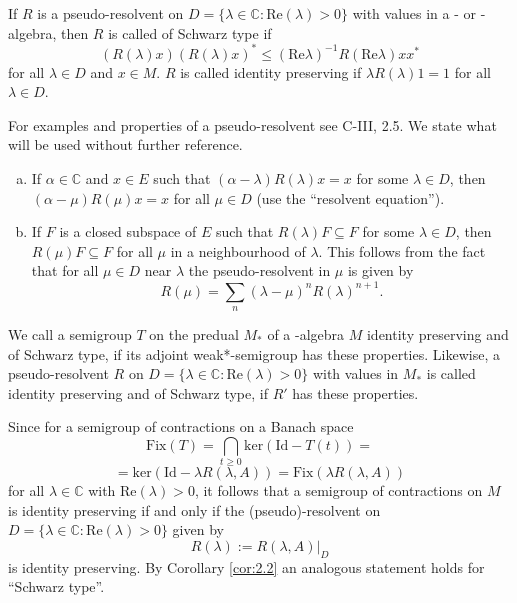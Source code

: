
If $ R $ is a pseudo-resolvent on $ D = \{\lambda \in \mathbb{C} : \text{Re}(\lambda) > 0\} $ with values in a \CA- or \WA-algebra, then $ R $ is called of Schwarz type if
\[
(R(\lambda)x)(R(\lambda)x)^{*} \leq (\text{Re}\lambda)^{-1} R(\text{Re}\lambda)xx^{*}
\]
for all $ \lambda \in D $ and $ x \in M $.
$ R $ is called identity preserving if $ \lambda R(\lambda)1 = 1 $ for all $ \lambda \in D $.

For examples and properties of a pseudo-resolvent see C-III, 2.5.
We state what will be used without further reference.

\begin{enumerate}[(a)]
\item 
If $ \alpha \in \mathbb{C} $ and $ x \in E $ such that $ (\alpha - \lambda)R(\lambda)x = x $ for some $ \lambda \in D $, then $ (\alpha - \mu)R(\mu)x = x $ for all $ \mu \in D $ (use the \enquote{resolvent equation}).

\item 
If $ F $ is a closed subspace of $ E $ such that $ R(\lambda)F \subseteq F $ for some $ \lambda \in D $, then $ R(\mu)F \subseteq F $ for all $ \mu $ in a neighbourhood of $ \lambda $.
This follows from the fact that for all $ \mu \in D $ near $ \lambda $ the pseudo-resolvent in $ \mu $ is given by
\[
R(\mu) = \sum_{n} (\lambda - \mu)^{n} R(\lambda)^{n+1}.
\]
\end{enumerate}

\begin{definition}\label{def:2.4}
We call a semigroup $ T $ on the predual $ M_{*} $ of a \WA-algebra $ M $ identity preserving and of Schwarz type, if its adjoint weak*-semigroup has these properties.
Likewise, a pseudo-resolvent $ R $ on $ D = \{\lambda \in \mathbb{C} : \text{Re}(\lambda) > 0\} $ with values in $ M_{*} $ is called identity preserving and of Schwarz type, if $ R' $ has these properties.
\end{definition}

Since for a semigroup of contractions on a Banach space
\[
\text{Fix}(T) = \bigcap_{t \geq 0} \text{ker}(\text{Id} - T(t)) =
\]
\[
= \text{ker}(\text{Id} - \lambda R(\lambda,A)) = \text{Fix}(\lambda R(\lambda,A))
\]
for all $ \lambda \in \mathbb{C} $ with $ \text{Re}(\lambda) > 0 $, it follows that a semigroup of contractions on $ M $ is identity preserving if and only if the (pseudo)-resolvent on $ D = \{\lambda \in \mathbb{C} : \text{Re}(\lambda) > 0\} $ given by
\[
R(\lambda) := R(\lambda,A)|_{D}
\]
is identity preserving.
By Corollary \ref{cor:2.2} an analogous statement holds for \enquote{Schwarz type}.

